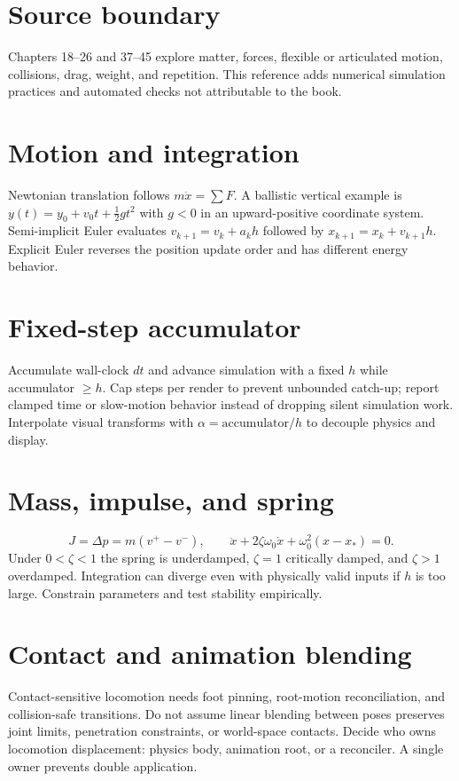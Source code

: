 \documentclass[10pt,letterpaper]{article}
\begin{document}
\makedoctitle
\makedocsummary
\tableofcontents\clearpage

\section{Source boundary}
Chapters 18--26 and 37--45 explore matter, forces, flexible or articulated motion, collisions, drag, weight, and repetition. This reference adds numerical simulation practices and automated checks not attributable to the book.
\section{Motion and integration}
Newtonian translation follows $m\ddot{x}=\sum F$. A ballistic vertical example is $y(t)=y_0+v_0t+\tfrac12gt^2$ with $g<0$ in an upward-positive coordinate system. Semi-implicit Euler evaluates $v_{k+1}=v_k+a_kh$ followed by $x_{k+1}=x_k+v_{k+1}h$. Explicit Euler reverses the position update order and has different energy behavior.
\section{Fixed-step accumulator}
Accumulate wall-clock $dt$ and advance simulation with a fixed $h$ while accumulator $\ge h$. Cap steps per render to prevent unbounded catch-up; report clamped time or slow-motion behavior instead of dropping silent simulation work. Interpolate visual transforms with $\alpha=\mathrm{accumulator}/h$ to decouple physics and display.
\section{Mass, impulse, and spring}
\[J=\Delta p=m(v^+-v^-),\qquad \ddot{x}+2\zeta\omega_0\dot{x}+\omega_0^2(x-x_*)=0.\]
Under $0<\zeta<1$ the spring is underdamped, $\zeta=1$ critically damped, and $\zeta>1$ overdamped. Integration can diverge even with physically valid inputs if $h$ is too large. Constrain parameters and test stability empirically.
\section{Contact and animation blending}
Contact-sensitive locomotion needs foot pinning, root-motion reconciliation, and collision-safe transitions. Do not assume linear blending between poses preserves joint limits, penetration constraints, or world-space contacts. Decide who owns locomotion displacement: physics body, animation root, or a reconciler. A single owner prevents double application.
\end{document}
